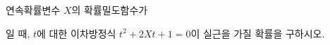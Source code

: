 연속확률변수 $X$의 확률밀도함수가 \par\smallskip{}\par\smallskip\noindent 일 때, $t$에 대한 이차방정식 $t^2+2Xt+1=0$이 실근을 가질 확률을 구하시오. 
